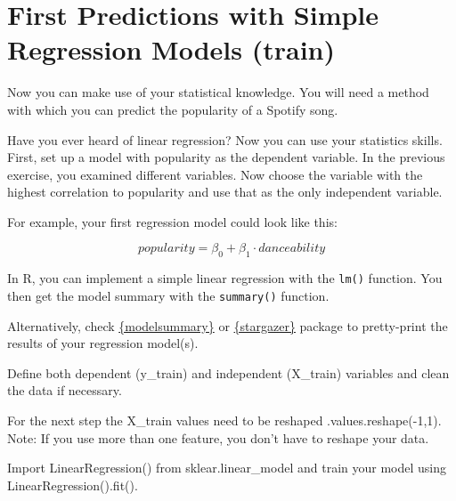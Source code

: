 \documentclass[
  11pt,
]{book}
\newenvironment{tips}[1]
  {
  \begin{itemize}
  \footnotesize
  \renewcommand{\labelitemi}{
    \raisebox{-.7\height}[0pt][0pt]{
      {\setkeys{Gin}{width=3em,keepaspectratio}
        \texttt{[image: images/\#1.png]}}
    }
  }
  \setlength{\fboxsep}{1em}
  \begin{rbox}
  \item
  }
  {
  \end{rbox}
  \end{itemize}
  }
\newenvironment{tipsp}[1]
  {
  \begin{itemize}
  \footnotesize
  \renewcommand{\labelitemi}{
    \raisebox{-.7\height}[0pt][0pt]{
      {\setkeys{Gin}{width=3em,keepaspectratio}
        \texttt{[image: images/\#1.png]}}
    }
  }
  \setlength{\fboxsep}{1em}
  \begin{pbox}
  \item
  }
  {
  \end{pbox}
  \end{itemize}
  }
\begin{document}
\hypertarget{first-predictions-with-simple-regression-models-train}{%
\section{First Predictions with Simple Regression Models (train)}\label{first-predictions-with-simple-regression-models-train}}

Now you can make use of your statistical knowledge. You will need a method with which you can predict the popularity of a Spotify song.

Have you ever heard of linear regression? Now you can use your statistics skills. First, set up a model with popularity as the dependent variable. In the previous exercise, you examined different variables. Now choose the variable with the highest correlation to popularity and use that as the only independent variable.

For example, your first regression model could look like this:

\[popularity = \beta_0 + \beta_1 \cdot danceability \]

\begin{tips}r

In R, you can implement a simple linear regression with the \texttt{lm()} function. You then get the model summary with the \texttt{summary()} function.

Alternatively, check \href{https://vincentarelbundock.github.io/modelsummary/}{\{modelsummary\}} or \href{https://www.jakeruss.com/cheatsheets/stargazer/}{\{stargazer\}} package to pretty-print the results of your regression model(s).

Define both dependent (y\_train) and independent (X\_train) variables and clean the data if necessary.

\end{tips}

\begin{tipsp}p

For the next step the X\_train values need to be reshaped .values.reshape(-1,1). Note: If you use more than one feature, you don't have to reshape your data.

Import LinearRegression() from sklear.linear\_model and train your model using LinearRegression().fit().

\end{tipsp}
\end{document}
